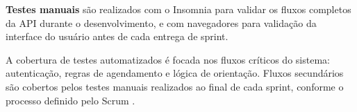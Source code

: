 \textbf{Testes manuais} são realizados com o
Insomnia para validar os fluxos completos da API
durante o desenvolvimento, e com navegadores para
validação da interface do usuário antes de cada
entrega de sprint.

A cobertura de testes automatizados é focada nos
fluxos críticos do sistema: autenticação, regras de
agendamento e lógica de orientação. Fluxos secundários
são cobertos pelos testes manuais realizados ao
final de cada sprint, conforme o processo definido
pelo Scrum \cite{schwaber2020}.
